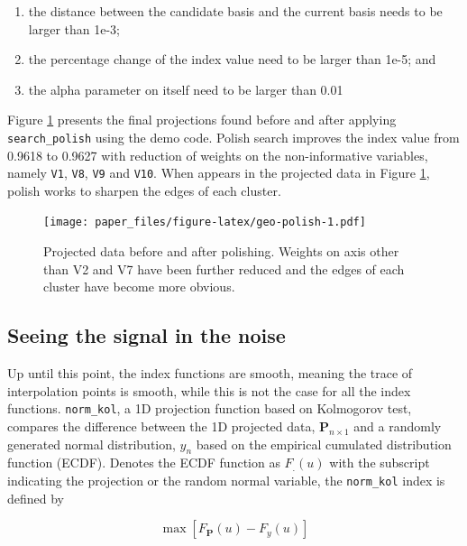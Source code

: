 \documentclass[12pt]{article}
\providecommand{\tightlist}{%
  \setlength{\itemsep}{0pt}\setlength{\parskip}{0pt}}
\begin{document}
\begin{enumerate}
\def\labelenumi{\arabic{enumi})}
\tightlist
\item
  the distance between the candidate basis and the current basis needs to be larger than 1e-3;
\item
  the percentage change of the index value need to be larger than 1e-5; and
\item
  the alpha parameter on itself need to be larger than 0.01
\end{enumerate}

Figure \ref{geo-polish} presents the final projections found before and after applying \texttt{search\_polish} using the demo code. Polish search improves the index value from 0.9618 to 0.9627 with reduction of weights on the non-informative variables, namely \texttt{V1}, \texttt{V8}, \texttt{V9} and \texttt{V10}. When appears in the projected data in Figure \ref{geo-polish}, polish works to sharpen the edges of each cluster.

\begin{figure}
\centering
\texttt{[image: paper\_files/figure-latex/geo-polish-1.pdf]}
\caption{\label{fig:geo-polish}\label{geo-polish}Projected data before and after polishing. Weights on axis other than V2 and V7 have been further reduced and the edges of each cluster have become more obvious.}
\end{figure}

\hypertarget{seeing-the-signal-in-the-noise}{%
\subsection{Seeing the signal in the noise}\label{seeing-the-signal-in-the-noise}}

Up until this point, the index functions are smooth, meaning the trace of interpolation points is smooth, while this is not the case for all the index functions. \texttt{norm\_kol}, a 1D projection function based on Kolmogorov test, compares the difference between the 1D projected data, \(\mathbf{P}_{n \times 1}\) and a randomly generated normal distribution, \(y_n\) based on the empirical cumulated distribution function (ECDF). Denotes the ECDF function as \(F_{.}(u)\) with the subscript indicating the projection or the random normal variable, the \texttt{norm\_kol} index is defined by

\[\max \left[F_{\mathbf{P}}(u) - F_{y}(u)\right]\]
\end{document}
